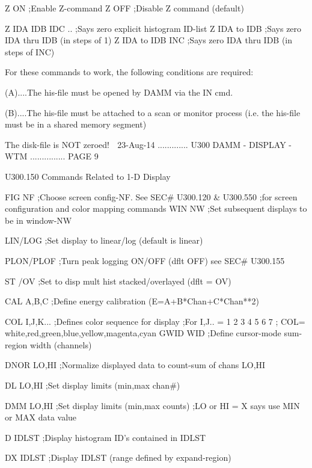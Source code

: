    Z  ON                ;Enable  Z-command
   Z  OFF               ;Disable Z command (default)
 
   Z  IDA IDB IDC ..    ;Says zero explicit histogram ID-list
   Z  IDA to IDB        ;Says zero IDA thru IDB (in steps of 1)
   Z  IDA to IDB INC    ;Says zero IDA thru IDB (in steps of INC)
 
   For these commands to work, the following conditions are required:
 
   (A)....The his-file must be opened by DAMM via the IN cmd.
 
   (B)....The his-file must be attached to a scan or monitor process
          (i.e. the his-file must be in a shared memory segment)
 
                          The disk-file is NOT zeroed!
    
   23-Aug-14 ............. U300  DAMM - DISPLAY - WTM ............... PAGE   9
 
 
   U300.150  Commands Related to 1-D Display
 
   FIG  NF        ;Choose screen config-NF. See SEC# U300.120 & U300.550
                  ;for screen configuration and color mapping commands
   WIN  NW        ;Set subsequent displays to be in window-NW
 
   LIN/LOG        ;Set display to linear/log  (default is linear)
 
   PLON/PLOF      ;Turn peak logging ON/OFF (dflt OFF) see SEC# U300.155
 
   ST /OV         ;Set to disp mult hist stacked/overlayed (dflt = OV)
 
   CAL  A,B,C     ;Define energy calibration (E=A+B*Chan+C*Chan**2)
 
   COL  I,J,K...  ;Defines color sequence for display
                  ;For I,J.. = 1     2   3     4    5    6       7
                  ;       COL= white,red,green,blue,yellow,magenta,cyan
   GWID WID       ;Define cursor-mode sum-region width (channels)
 
   DNOR LO,HI     ;Normalize displayed data to count-sum of chans LO,HI
 
   DL   LO,HI     ;Set display limits (min,max chan#)
 
   DMM  LO,HI     ;Set display limits (min,max counts)
                  ;LO or HI = X  says use MIN or MAX data value
 
   D    IDLST     ;Display histogram ID's contained in IDLST
 
   DX   IDLST     ;Display IDLST (range defined by expand-region)
 
